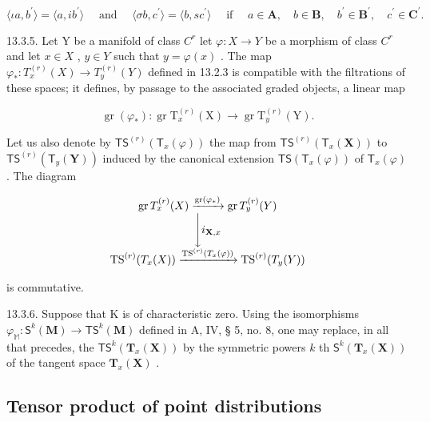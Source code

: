 \[
\langle \iota a, b ^ {\prime} \rangle = \langle a, i b ^ {\prime} \rangle \quad \text { and } \quad \langle \sigma b, c ^ {\prime} \rangle = \langle b, s c ^ {\prime} \rangle \quad \text { if } \quad a \in \mathbf {A}, \quad b \in \mathbf {B}, \quad b ^ {\prime} \in \mathbf {B} ^ {\prime}, \quad c ^ {\prime} \in \mathbf {C} ^ {\prime}.
\]

13.3.5. Let Y be a manifold of class \(C^{r}\) let \(\varphi: X \to Y\) be a morphism of class \(C^{r}\) and let \(x \in X\) , \(y \in Y\) such that \(y = \varphi(x)\) . The map \(\varphi_{*}: T_{x}^{(r)}(X) \to T_{y}^{(r)}(Y)\) defined in 13.2.3 is compatible with the filtrations of these spaces; it defines, by passage to the associated graded objects, a linear map

\[
\operatorname{gr} \left(\varphi_ {*}\right): \operatorname{gr} \mathrm{T} _ {x} ^ {(r)} (\mathrm{X}) \rightarrow \operatorname{gr} \mathrm{T} _ {y} ^ {(r)} (\mathrm{Y}).
\]

Let us also denote by \(\mathsf{TS}^{(r)}(\mathsf{T}_x(\varphi))\) the map from \(\mathsf{TS}^{(r)}(\mathsf{T}_x(\mathbf{X}))\) to \(\mathsf{TS}^{(r)}(\mathsf{T}_y(\mathbf{Y}))\) induced by the canonical extension \(\mathsf{TS}(\mathsf{T}_x(\varphi))\) of \(\mathsf{T}_x(\varphi)\) . The diagram

\[
\begin{array}{c} \operatorname{gr} T _ {x} ^ {(r)} (X) \xrightarrow {\operatorname{gr} (\varphi_ {*})} \operatorname{gr} T _ {y} ^ {(r)} (Y) \\ \Biggl \downarrow i _ {\mathbf {X}, x} \\ \operatorname{TS} ^ {(r)} (T _ {x} (X)) \xrightarrow {\operatorname{TS} ^ {(r)} (T _ {x} (\varphi))} \operatorname{TS} ^ {(r)} (T _ {y} (Y)) \end{array}
\]

is commutative.

13.3.6. Suppose that K is of characteristic zero. Using the isomorphisms \(\varphi_{\mathbb{M}}: \mathsf{S}^k(\mathbf{M}) \to \mathsf{TS}^k(\mathbf{M})\) defined in A, IV, § 5, no. 8, one may replace, in all that precedes, the \(\mathsf{TS}^k(\mathbf{T}_x(\mathbf{X}))\) by the symmetric powers \(k\) th \(\mathsf{S}^k(\mathbf{T}_x(\mathbf{X}))\) of the tangent space \(\mathbf{T}_x(\mathbf{X})\) .

\subsection{Tensor product of point distributions}

